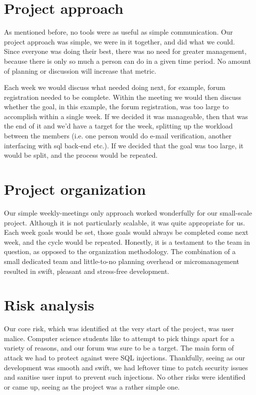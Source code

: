 \documentclass[a4paper, 12pt]{article}
\begin{document}
	\section{Project approach}
		\par As mentioned before, no tools were as useful as simple communication. Our project approach was simple, we were in it together,
		and did what we could. Since everyone was doing their best, there was no need for greater management, because there is only so
		much a person can do in a given time period. No amount of planning or discussion will increase that metric.
		\par Each week we would discuss what needed doing next, for example, forum registration needed to be complete. Within the meeting we
		would then discuss whether the goal, in this example, the forum registration, was too large to accomplish within a single week. If we decided
		it was manageable, then that was the end of it and we'd have a target for the week, splitting up the workload between the members (i.e.
		 one person would do e-mail verification, another interfacing with sql back-end etc.). If we decided that the goal was too large, it would
		be split, and the process would be repeated. 
	\section{Project organization}
		\par Our simple weekly-meetings only approach worked wonderfully for our small-scale project. Although it is not particularly scalable,
		it was quite appropriate for us. Each week goals would be set, those goals would always be completed come next week, and the cycle
		would be repeated. Honestly, it is a testament to the team in question, as opposed to the organization methodology. The combination of
		a small dedicated team and little-to-no planning overhead or micromanagement resulted in swift, pleasant and stress-free development.
	\section{Risk analysis}
		\par Our core risk, which was identified at the very start of the project, was user malice. Computer science students like to attempt
		to pick things apart for a variety of reasons, and our forum was sure to be a target. The main form of attack we had to protect against
		were SQL injections. Thankfully, seeing as our development was smooth and swift, we had leftover time to patch security issues and 
		sanitise user input to prevent such injections. No other risks were identified or came up, seeing as the project was a rather simple
		one.
\end{document}
